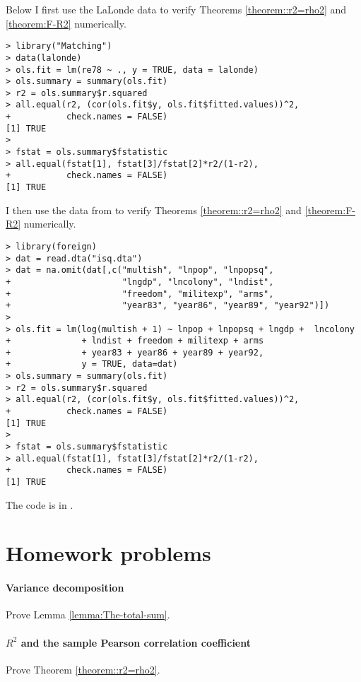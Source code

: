 Below I first use the LaLonde data to verify Theorems \ref{theorem::r2=rho2} and \ref{theorem:F-R2} numerically. 
\begin{lstlisting}
> library("Matching")
> data(lalonde)
> ols.fit = lm(re78 ~ ., y = TRUE, data = lalonde)
> ols.summary = summary(ols.fit)
> r2 = ols.summary$r.squared
> all.equal(r2, (cor(ols.fit$y, ols.fit$fitted.values))^2,
+           check.names = FALSE)
[1] TRUE
> 
> fstat = ols.summary$fstatistic
> all.equal(fstat[1], fstat[3]/fstat[2]*r2/(1-r2),
+           check.names = FALSE)
[1] TRUE
\end{lstlisting}    


I then use the data from \citet{king2015robust} to verify Theorems \ref{theorem::r2=rho2} and \ref{theorem:F-R2} numerically. 
\begin{lstlisting}
> library(foreign)
> dat = read.dta("isq.dta")
> dat = na.omit(dat[,c("multish", "lnpop", "lnpopsq", 
+                      "lngdp", "lncolony", "lndist", 
+                      "freedom", "militexp", "arms", 
+                      "year83", "year86", "year89", "year92")])
> 
> ols.fit = lm(log(multish + 1) ~ lnpop + lnpopsq + lngdp +  lncolony 
+              + lndist + freedom + militexp + arms 
+              + year83 + year86 + year89 + year92, 
+              y = TRUE, data=dat)
> ols.summary = summary(ols.fit)
> r2 = ols.summary$r.squared
> all.equal(r2, (cor(ols.fit$y, ols.fit$fitted.values))^2,
+           check.names = FALSE)
[1] TRUE
> 
> fstat = ols.summary$fstatistic
> all.equal(fstat[1], fstat[3]/fstat[2]*r2/(1-r2),
+           check.names = FALSE)
[1] TRUE
\end{lstlisting}    
    
The  code is in . 
    

\section{Homework problems}

\paragraph{Variance decomposition}\label{hw09::var-decompose}
Prove Lemma \ref{lemma:The-total-sum}. 


\paragraph{$R^2$ and the sample Pearson correlation coefficient}\label{hw9::r2-pcc}
Prove Theorem \ref{theorem::r2=rho2}. 



